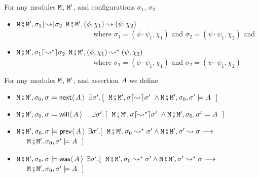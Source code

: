 \begin{definition}  \label{??}
For any modules $\M$, $\M'$, and configurations $\sigma_1$, $\sigma_2$
\begin{itemize}
\item
$\M\mkpair \M',  \sigma_1\lceil\leadsto\rceil \sigma_2$ 
\IFF
$\M\mkpair \M',  (\phi, \chi_1) \leadsto(\psi, \chi_2)$\\
$\strut ~ \hspace{1.4in} $ \hfill 
where
$\sigma_1 = (\phi \cdot \psi_1, \chi_1)$ and $\sigma_2 = (\psi \cdot \psi_1, \chi_2)$
and
\item
$\M\mkpair \M',  \sigma_1\lceil\leadsto^*\rceil \sigma_2$ 
\IFF
$\M\mkpair \M',  (\phi, \chi_1) \leadsto^* (\psi, \chi_2)$\\
$\strut ~ \hspace{1.4in} $ \hfill 
where
$\sigma_1 = (\phi \cdot \psi_1, \chi_1)$ and $\sigma_2 = (\psi \cdot \psi_1, \chi_2)$
\end{itemize}
\end{definition}
\begin{definition}  \label{def:valid:assertion:time}
For any modules $\M$, $\M'$, and assertion  $\A$ we define
\begin{itemize}
 \item
  $\M\mkpair \M', \sigma_0 , \sigma \models  \Next \A $
  \IFF
  $\exists \sigma'.\, [\ \ \M\mkpair \M',\sigma \lceil\leadsto\rceil \sigma' \ \wedge \M\mkpair \M',\sigma_0 , \sigma' \models \A \ \  ]$
  \item
  $\M\mkpair \M', \sigma_0 , \sigma \models  \Future \A $
  \ \IFF
  $\exists \sigma'.\, [\ \ \M\mkpair \M',\sigma \lceil\leadsto^*\rceil \sigma' \ \wedge \M\mkpair \M',\sigma_0 , \sigma' \models \A \ \  ]$
  \item
 $\M\mkpair \M', \sigma_0 , \sigma \models  \Prev \A $\IFF
$\exists \sigma'. [\ \  \M\mkpair \M',\sigma_0 \leadsto^* \sigma' \wedge \M\mkpair \M',\sigma' \leadsto \sigma \longrightarrow $\\
 $\strut ~ \hspace{0.1in} $   \hfill 
$ \M\mkpair \M', \sigma_0 , \sigma'  \models \A\ \ 
 ]$ 
 \item
 $\M\mkpair \M',\sigma_0 ,  \sigma \models  \Past \A $ \IFF
$\exists \sigma'. [\ \  \M\mkpair \M',\sigma_0 \leadsto^* \sigma' \wedge \M\mkpair \M',\sigma' \leadsto^* \sigma \longrightarrow $\\
 $\strut ~ \hspace{0.1in} $   \hfill   
 $\M\mkpair \M', \sigma_0 , \sigma'  \models \A\ \ 
 ]$ 
\end{itemize}
\end{definition}

